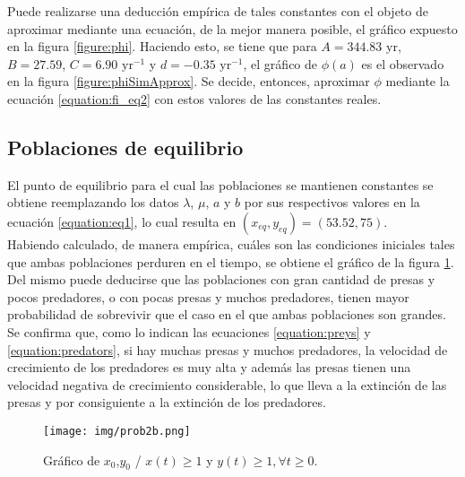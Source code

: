 \documentclass[journal, monochrome]{IEEEtran}
\begin{document}
Puede realizarse una deducción empírica de tales constantes con el objeto de aproximar mediante una ecuación, de la mejor manera posible, el gráfico expuesto en la figura \ref{figure:phi}. Haciendo esto, se 
tiene que para $A = 344.83 \text{ yr}$, $B = 27.59$, $C = 6.90 \text{ yr}^{-1}$ y $d = -0.35 \text{ yr}^{-1}$, el gráfico de $\phi(a)$ es el observado en la figura \ref{figure:phiSimApprox}.
Se decide, entonces, aproximar $\phi$ mediante la ecuación \ref{equation:fi_eq2} con estos valores de las constantes reales.

\begin{figure*}[h]
	\centering
	\caption{Curvas del desfasaje en función del parámetro $a$.}
	\label{figure:phis}
\end{figure*}

\subsection{Poblaciones de equilibrio}

El punto de equilibrio para el cual las poblaciones se mantienen constantes se obtiene reemplazando los datos $\lambda$, $\mu$, $a$ y $b$ por sus respectivos valores en la ecuación \ref{equation:eq1}, 
lo cual resulta en $(x_{eq}, y_{eq}) = (53.52, 75)$. \\

Habiendo calculado, de manera empírica, cuáles son las condiciones iniciales tales que ambas poblaciones perduren en el tiempo, se obtiene el gráfico de la figura \ref{figure:prob2b}. Del mismo puede deducirse que las poblaciones con gran cantidad de presas y pocos predadores, o con pocas presas y muchos predadores, tienen mayor probabilidad de sobrevivir que el caso en el que ambas poblaciones son grandes. Se confirma que, como lo indican las ecuaciones \ref{equation:preys} y \ref{equation:predators}, si hay muchas presas y muchos predadores, la velocidad de crecimiento de los predadores es muy alta y además las presas tienen una velocidad negativa de crecimiento considerable, lo que lleva a la extinción de las presas y por consiguiente a la extinción de los predadores.

\begin{figure}[h]
	\centering
	\texttt{[image: img/prob2b.png]}
	\caption{Gráfico de $x_{0}$,$y_{0}$ / $x(t) \geq 1$ y $y(t) \geq 1, \forall t \geq 0$.}
	\label{figure:prob2b}
\end{figure}
\end{document}
